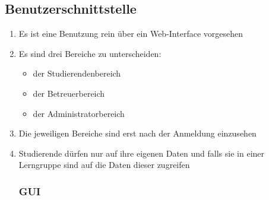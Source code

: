 \documentclass[parskip=full]{scrartcl}
\begin{document}

\subsection{Benutzerschnittstelle}
\begin{enumerate}
  \item Es ist eine Benutzung rein über ein Web-Interface vorgesehen
  \item Es sind drei Bereiche zu unterscheiden:
        \begin{itemize}
          \item der Studierendenbereich
          \item der Betreuerbereich
          \item der Administratorbereich
        \end{itemize}
  \item Die jeweiligen Bereiche sind erst nach der Anmeldung einzusehen 
  \item Studierende dürfen nur auf ihre eigenen Daten und falls sie in einer
 \gls{Lerngruppe} sind auf die Daten dieser zugreifen 
\subsubsection{GUI}
{\centering
\setlength{\textheight}{297mm}
\setlength{\headheight}{0mm}
\thispagestyle{empty}

 \label{GUIindex}



}
\end{enumerate}
\end{document}

